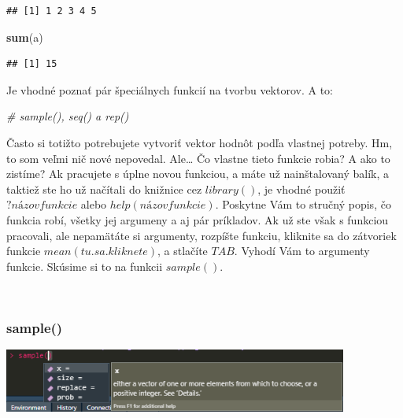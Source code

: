 \documentclass[]{article}
\newenvironment{Shaded}{\begin{snugshade}}{\end{snugshade}}
\newcommand{\CommentTok}[1]{\textcolor[rgb]{0.56,0.35,0.01}{\textit{#1}}}
\newcommand{\KeywordTok}[1]{\textcolor[rgb]{0.13,0.29,0.53}{\textbf{#1}}}
\newcommand{\NormalTok}[1]{#1}
\begin{document}
\begin{verbatim}
## [1] 1 2 3 4 5
\end{verbatim}

\begin{Shaded}
\begin{Highlighting}[]
\KeywordTok{sum}\NormalTok{(a)}
\end{Highlighting}
\end{Shaded}

\begin{verbatim}
## [1] 15
\end{verbatim}

Je vhodné poznať pár špeciálnych funkcií na tvorbu vektorov. A to:

\begin{Shaded}
\begin{Highlighting}[]
\CommentTok{# sample(), seq() a rep()}
\end{Highlighting}
\end{Shaded}

Často si totižto potrebujete vytvoriť vektor hodnôt podľa vlastnej
potreby. Hm, to som veľmi nič nové nepovedal. Ale\ldots{} Čo vlastne
tieto funkcie robia? A ako to zistíme? Ak pracujete s úplne novou
funkciou, a máte už nainštalovaný balík, a taktiež ste ho už načítali do
knižnice cez \(library()\), je vhodné použiť \(?názovfunkcie\) alebo
\(help(názovfunkcie)\). Poskytne Vám to stručný popis, čo funkcia robí,
všetky jej argumeny a aj pár príkladov. Ak už ste však s funkciou
pracovali, ale nepamätáte si argumenty, rozpíšte funkciu, kliknite sa do
zátvoriek funkcie \(mean(tu.sa.kliknete)\), a stlačíte \(TAB\). Vyhodí
Vám to argumenty funkcie. Skúsime si to na funkcii \(sample()\).

~

\hypertarget{sample}{%
\subsubsection{sample()}\label{sample}}

\begin{center}

\includegraphics[width=0.85\textwidth,height=\textheight]{diplomka obrazky/2.png}

\end{center}
\end{document}
